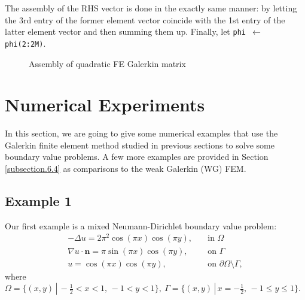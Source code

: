	The assembly of the RHS vector is done in the exactly same manner:
	by letting the 3rd entry of the former element vector coincide with
	the 1st entry of the latter element vector and then summing them up.
	Finally, let \texttt{phi $\gets$ phi(2:2M)}.
		
	\begin{figure}[!htbp]	
		\centering
		
		\caption{Assembly of quadratic FE Galerkin matrix}
		\label{tikz:1D_assembly_of_quadratic_FE_Galerkin_matrix}
	\end{figure}
	
	 
	\vspace{-10pt}
	\section{Numerical Experiments}\label{section.5}
	In this section, we are going to give some numerical examples that use the
	Galerkin finite element method studied in previous sections to solve some
	boundary value problems. A few more examples are provided in Section
	\ref{subsection.6.4} as comparisons to the weak Galerkin (WG) FEM.
	
	\subsection{Example 1}\label{subsection.5.1}
	Our first example is a mixed Neumann-Dirichlet boundary value problem:
	\begin{align*}
		-\Delta{u}=2\pi^2\cos(\pi x)\cos(\pi y),\quad &\textrm{in }\Omega\\
		\nabla{u}\cdot\boldsymbol{n}=\pi\sin(\pi x)\cos(\pi y), 
		\quad&\textrm{on }\Gamma\\
		u=\cos(\pi x)\cos(\pi y),\quad
		&\textrm{on }\partial\Omega\setminus\Gamma,
	\end{align*}
	where $\Omega=\{(x,y)\,|\,-\frac{1}{2} < x < 1,\, -1 < y < 1 \},\ 
	\Gamma = \{(x,y)\,|\, x=-\frac{1}{2},\, -1 \leq y \leq 1 \}$.
	
